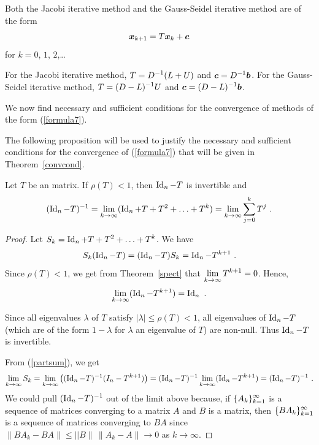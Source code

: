 Both the Jacobi iterative method and the Gauss-Seidel iterative
method are of the form
\begin{equation} \label{formula7}
\bm{x}_{k+1} = T \bm{x}_{k} + \bm{c}
\end{equation}
for $k=0$, $1$, $2$,\ldots

For the Jacobi iterative method, $\displaystyle T = D^{-1}(L + U)$ and
$\displaystyle \bm{c} = D^{-1}\bm{b}$.  For the Gauss-Seidel iterative method,
$\displaystyle T = (D-L)^{-1} U$ and
$\displaystyle \bm{c} = (D-L)^{-1}\bm{b}$.

We now find necessary and sufficient conditions for the convergence of
methods of the form (\ref{formula7}).

The following proposition will be used to justify the necessary and
sufficient conditions for the convergence of (\ref{formula7}) that
will be given in Theorem~\ref{convcond}.

\begin{prop}
Let $T$ be an \nn matrix.  If $\rho(T) < 1$, then $\operatorname{Id}_n - T$ is
invertible and
\[
(\operatorname{Id}_n-T)^{-1}
= \lim_{k\rightarrow \infty} (\operatorname{Id}_n + T + T^2 + \ldots + T^k)
= \lim_{k\rightarrow \infty} \sum_{j=0}^k T^j \ .
\]
\label{Banach}
\end{prop}

\begin{proof}
Let $\displaystyle S_k = \operatorname{Id}_n + T + T^2 + \ldots + T^k$.  We have
\begin{equation}\label{partsum}
S_k(\operatorname{Id}_n-T) = (\operatorname{Id}_n-T)S_k = \operatorname{Id}_n - T^{k+1} \ .
\end{equation}
Since $\rho(T) < 1$, we get from Theorem~\ref{spect} that
$\displaystyle \lim_{k\rightarrow \infty} T^{k+1} = 0$.  Hence,
\[
\lim_{k\rightarrow \infty} (\operatorname{Id}_n - T^{k+1}) = \operatorname{Id}_n \ .
\]

Since all eigenvalues $\lambda$ of $T$ satisfy
$|\lambda| \leq \rho(T) < 1$, all eigenvalues of $\operatorname{Id}_n-T$ (which
are of the form $1-\lambda$ for $\lambda$ an eigenvalue of $T$) are
non-null.  Thus $\operatorname{Id}_n-T$ is invertible.

From (\ref{partsum}), we get
\[
\lim_{k\rightarrow\infty} S_k = \lim_{k\rightarrow\infty}
\left( (\operatorname{Id}_n-T)^{-1} (I_n-T^{k+1}) \right) =
(\operatorname{Id}_n-T)^{-1} \lim_{k\rightarrow \infty} (\operatorname{Id}_n-T^{k+1}) =
(\operatorname{Id}_n-T)^{-1} \ .
\]
We could pull $\displaystyle (\operatorname{Id}_n-T)^{-1}$ out of the limit above
because, if $\displaystyle \{A_k\}_{k=1}^\infty$ is a sequence of \nn
matrices converging to a matrix $A$ and $B$ is a \nn matrix, then
$\displaystyle \{B A_k\}_{k=1}^\infty$ is a sequence of \nn matrices
converging to $BA$ since
$\|BA_k- BA \| \leq ||B \|\,\|A_k - A\| \to 0$ as $k \to \infty$.
\end{proof}

